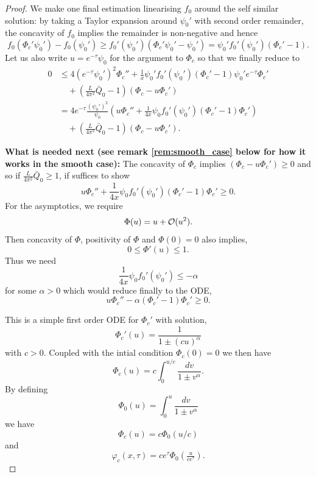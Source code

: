 \documentclass[11pt]{amsart}
\begin{document}
\begin{proof}
We make one final estimation linearising $f_0$ around the self similar solution: by taking a Taylor expansion around $\psi_0'$ with second order remainder, the concavity of $f_0$ implies the remainder is non-negative and hence
\[
f_0(\Phi_c' \psi_0') - f_0(\psi_0') \geq f_0'(\psi_0')(\Phi_c'\psi_0' - \psi_0') = \psi_0' f_0'(\psi_0')(\Phi_c' - 1).
\]
Let us also write $u = e^{-\tau} \psi_0$ for the argument to $\Phi_c$ so that we finally reduce to
\begin{equation}
\label{eq:Phi_ode}
\begin{split}
0 &\leq 4 (e^{-\tau} \psi_0')^2 \Phi_c'' + \frac{1}{x} \psi_0' f_0'(\psi_0')(\Phi_c' - 1) \psi_0' e^{-\tau} \Phi_c' \\
&\quad + \left(\frac{L}{4\pi^2} \bar{Q}_0 - 1\right) \left(\Phi_c - u \Phi_c'\right) \\
&= 4 e^{-\tau} \frac{(\psi_0')^2}{\psi_0} \left(u \Phi_c'' + \frac{1}{4x} \psi_0 f_0'(\psi_0')(\Phi_c' - 1) \Phi_c'\right) \\
&\quad + \left(\frac{L}{4\pi^2} \bar{Q}_0 - 1\right) \left(\Phi_c - u \Phi_c'\right).
\end{split}
\end{equation}

\textbf{What is needed next (see remark \ref{rem:smooth_case} below for how it works in the smooth case):}
The concavity of $\Phi_c$ implies $\left(\Phi_c - u \Phi_c'\right) \geq 0$ and so if $\frac{L}{4\pi^2} \bar{Q}_0 \geq 1$, if suffices to show
\[
u \Phi_c'' + \frac{1}{4x} \psi_0 f_0'(\psi_0')(\Phi_c' - 1) \Phi_c' \geq 0.
\]
For the asymptotics, we require
\[
\Phi(u) = u + \operatorname{\mathcal{O}}(u^2).
\]
Then concavity of $\Phi$, positivity of $\Phi$ and $\Phi(0) = 0$ also implies,
\[
0 \leq \Phi'(u) \leq 1.
\]
Thus we need
\[
\frac{1}{4x} \psi_0 f_0'(\psi_0') \leq -\alpha
\]
for some $\alpha > 0$ which would reduce finally to the ODE,
\begin{equation}
\label{eq:comparison_ode}
u \Phi_c'' - \alpha (\Phi_c' - 1) \Phi_c' \geq 0.
\end{equation}

This is a simple first order ODE for $\Phi_c'$ with solution,
\[
\Phi_c'(u) = \frac{1}{1 \pm (cu)^{\alpha}}
\]
with $c > 0$. Coupled with the intial condition $\Phi_c(0) = 0$ we then have
\begin{equation}
\label{eq:Phi}
\Phi_c (u) = c \int_0^{u/c} \frac{dv}{1 \pm v^{\alpha}}.
\end{equation}
By defining
\[
\Phi_0(u) = \int_0^{u} \frac{dv}{1 \pm v^{\alpha}}
\]
we have
\[
\Phi_c(u) = c \Phi_0(u/c)
\]
and
\[
\varphi_c(x, \tau) = c e^{\tau} \Phi_0\left(\tfrac{u}{ce^{\tau}}\right).
\]


\end{proof}
\end{document}
